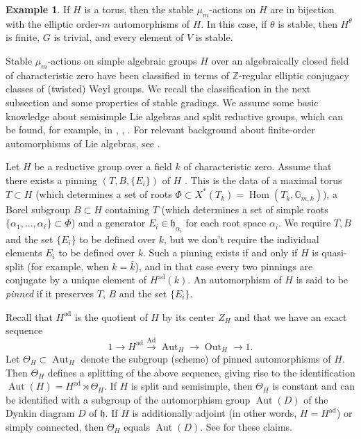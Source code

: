\documentclass{article} %
\numberwithin{equation}{section}
\theoremstyle{definition}
\newtheorem{example}[proposition]{Example}
\newcommand{\G}{\mathbb{G}}
\DeclareMathOperator{\Ad}{Ad}
\DeclareMathOperator{\Hom}{Hom}
\DeclareMathOperator{\Aut}{Aut}
\DeclareMathOperator{\Out}{Out}
\newcommand{\Z}{\mathbb{Z}}
\newcommand{\frakh}{\mathfrak h}
\begin{document}
 \begin{example}\label{ex-torus}
 If $H$ is a torus, then the stable $\mu_m$-actions on $H$ are in bijection with the elliptic order-$m$ automorphisms of $H$. In this case, if $\theta$ is stable, then $H^\theta$ is finite, $G$ is trivial, and every element of $V$ is stable.
 \end{example}




Stable $\mu_m$-actions on simple algebraic groups $H$ over an algebraically closed field of characteristic zero have been classified \cite[\S7.1, \S7.2]{GrossLevyReederYu-GradingsPosRank} in terms of $\Z$-regular elliptic conjugacy classes of (twisted) Weyl groups.
We recall the classification in the next subsection and some properties of stable gradings. We assume some basic knowledge about semisimple Lie algebras and split reductive groups, which can be found, for example, in \cite{Humphreys}, \cite{Steinberg-Chevalley}, \cite{Conrad-SGA}. For relevant background about finite-order automorphisms of Lie algebras, see \cite{Reeder-torsion}.


Let $H$ be a reductive group over a field $k$ of characteristic zero. 
Assume that there exists a pinning $(T,B,\{E_i\})$ of $H$ \cite[Definition 1.5.4]{Conrad-SGA}.
This is the data of a maximal torus $T\subset H$ (which determines a set of roots $\Phi\subset X^*(T_{\bar{k}}) = \Hom(T_{\bar{k}}, \G_{m,\bar{k}})$), a Borel subgroup $B\subset H$ containing $T$ (which determines a set of simple roots $\{\alpha_1, \dots, \alpha_{\ell}\}\subset \Phi$) and a generator $E_i \in \frakh_{\alpha_i}$ for each root space $\alpha_i$.
We require $T,B$ and the set $\{E_i\}$ to be defined over $k$, but we don't require the individual elements $E_i$ to be defined over $k$.
Such a pinning exists if and only if $H$ is quasi-split (for example, when $k = \bar{k}$), and in that case every two pinnings are conjugate by a unique element of $H^{\mathrm{ad}}(k)$.
An automorphism of $H$ is said to be \textit{pinned} if it preserves $T$, $B$ and the set $\{E_i\}$.

Recall that $H^{\mathrm{ad}}$ is the quotient of $H$ by its center $Z_H$ and that we have an exact sequence
\[
1\rightarrow H^{\mathrm{ad}}\xrightarrow{\Ad} \Aut_H \rightarrow \Out_H\rightarrow 1.
\]
Let $\Theta_H \subset \Aut_H$ denote the subgroup (scheme) of pinned automorphisms of $H$.
Then $\Theta_H$ defines a splitting of the above sequence, giving rise to the identification $\Aut(H) = H^{\mathrm{ad}} \rtimes \Theta_H$.
If $H$ is split and semisimple, then $\Theta_H$ is constant and can be identified with a subgroup of the automorphism group $\Aut(D)$ of the Dynkin diagram $D$ of $\frakh$.
If $H$ is additionally adjoint (in other words, $H = H^{\mathrm{ad}}$) or simply connected, then $\Theta_H$ equals $\Aut(D)$.
See \cite[Section 1.5]{Conrad-SGA} for these claims.
\end{document}
